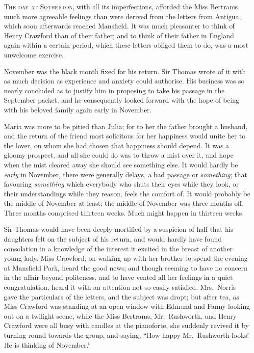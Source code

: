 \documentclass{article}
\newcommand{\gintro}[1]{\textcolor{gcolor}{\textsc{#1}}}
\begin{document}
\gintro{The day at Sotherton,} with all its imperfections,
afforded the Miss Bertrams much more agreeable feelings
than were derived from the letters from Antigua,
which soon afterwards reached Mansfield.  It was much
pleasanter to think of Henry Crawford than of their father;
and to think of their father in England again within
a certain period, which these letters obliged them to do,
was a most unwelcome exercise.

November was the black month fixed for his return.
Sir Thomas wrote of it with as much decision as experience
and anxiety could authorise.  His business was so nearly
concluded as to justify him in proposing to take his
passage in the September packet, and he consequently
looked forward with the hope of being with his beloved
family again early in November.

Maria was more to be pitied than Julia; for to her the
father brought a husband, and the return of the friend most
solicitous for her happiness would unite her to the lover,
on whom she had chosen that happiness should depend.
It was a gloomy prospect, and all she could do was to
throw a mist over it, and hope when the mist cleared
away she should see something else.  It would hardly
be \emph{early} in November, there were generally delays,
a bad passage or \emph{something}; that favouring \emph{something}
which everybody who shuts their eyes while they look,
or their understandings while they reason, feels the
comfort of.  It would probably be the middle of November
at least; the middle of November was three months off.
Three months comprised thirteen weeks.  Much might happen
in thirteen weeks.

Sir Thomas would have been deeply mortified by a suspicion
of half that his daughters felt on the subject of his return,
and would hardly have found consolation in a knowledge of the
interest it excited in the breast of another young lady.
Miss Crawford, on walking up with her brother to spend
the evening at Mansfield Park, heard the good news;
and though seeming to have no concern in the affair
beyond politeness, and to have vented all her feelings
in a quiet congratulation, heard it with an attention
not so easily satisfied.  Mrs.\ Norris gave the particulars
of the letters, and the subject was dropt; but after tea,
as Miss Crawford was standing at an open window with
Edmund and Fanny looking out on a twilight scene,
while the Miss Bertrams, Mr.\ Rushworth, and Henry Crawford
were all busy with candles at the pianoforte, she suddenly
revived it by turning round towards the group, and saying,
``How happy Mr.\ Rushworth looks!  He is thinking of November.''
\end{document}
